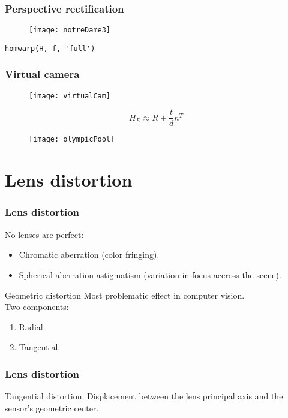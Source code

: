 \begin{frame}[fragile]
\frametitle{Perspective rectification}
\begin{figure}[!h]
\centering
\texttt{[image: notreDame3]}
\end{figure}
\begin{lstlisting}
homwarp(H, f, 'full')
\end{lstlisting}
\end{frame}

\begin{frame}
\frametitle{Virtual camera}
\begin{figure}[!h]
\centering
\texttt{[image: virtualCam]}
\end{figure}
\[
H_{E} \approx R + \dfrac{t}{d} n^{T}
\]
\end{frame}

\begin{frame}
\begin{figure}[!h]
\centering
\texttt{[image: olympicPool]}
\end{figure}
\end{frame}

\section{Lens distortion}

\begin{frame}
\frametitle{Lens distortion}
No lenses are perfect:
\begin{itemize}
\item Chromatic aberration (color fringing).
\item Spherical aberration astigmatism (variation in focus accross the scene).
\end{itemize}
\begin{block}{Geometric distortion}
Most problematic effect in computer vision.\\
Two components:
\begin{enumerate}
\item Radial.
\item Tangential.
\end{enumerate}
\end{block}
\end{frame}

\begin{frame}
\frametitle{Lens distortion}
Tangential distortion. Displacement between the lens principal axis and the sensor's geometric center.\\
\end{frame}

